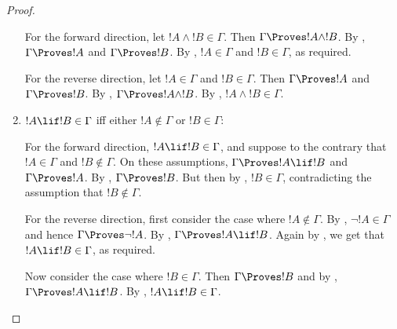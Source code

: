 \documentclass[../../include/open-logic-section]{subfiles}
\begin{document}
\begin{proof}
\begin{enumerate}
For the forward direction, let $!A \land !B \in \Gamma$. Then $\Gamma
\Proves !A \land !B$. By
,
$\Gamma \Proves !A$ and $\Gamma \Proves !B$. By
, $!A \in \Gamma$ and $!B \in \Gamma$, as
required.

For the reverse direction, let $!A \in \Gamma$ and $!B \in
\Gamma$. Then $\Gamma \Proves !A$ and $\Gamma \Proves !B$. By
,
$\Gamma \Proves !A \land !B$. By , $!A \land
!B \in \Gamma$.

\item $!A \lif !B \in \Gamma$ iff either $!A \notin \Gamma$ or $!B \in
  \Gamma$:

For the forward direction, $!A \lif !B \in \Gamma$, and suppose to the
contrary that $!A \in \Gamma$ and $!B \notin \Gamma$. On these
assumptions, $\Gamma \Proves !A \lif !B$ and $\Gamma \Proves !A$. By
,
$\Gamma \Proves !B$. But then by , $!B \in
\Gamma$, contradicting the assumption that $!B \notin \Gamma$.

For the reverse direction, first consider the case where $!A \notin
\Gamma$. By , $\lnot !A \in \Gamma$ and
hence $\Gamma \Proves \lnot !A$. By
,
$\Gamma \Proves !A \lif !B$. Again by , we get
that $!A \lif !B \in \Gamma$, as required.

Now consider the case where $!B \in \Gamma$. Then $\Gamma \Proves !B$
and by
,
$\Gamma \Proves !A \lif !B$. By , $!A \lif !B
\in \Gamma$.
\end{enumerate}
\end{proof}
\end{document}
